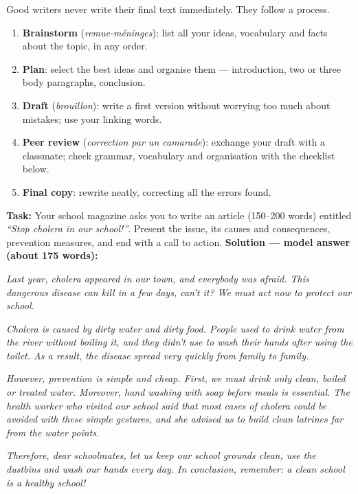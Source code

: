 \documentclass[11pt]{article}
\newcounter{popsec}
\newcounter{popsub}
\newcommand{\courssub}[1]{%
  \stepcounter{popsub}%
  \par\vspace{9pt}\noindent{\popxbold\fontsize{11.5}{13}\selectfont\color{popink}{\color{poporange}\thepopsec.\thepopsub}\hspace{6pt}#1}\par\nopagebreak\vspace{4pt}
}
\begin{document}
\courssub{The writing process: five steps}

Good writers never write their final text immediately. They follow a process.

\begin{methode}
\begin{enumerate}
\item \textbf{Brainstorm} (\emph{remue-méninges}): list all your ideas, vocabulary and facts about the topic, in any order.
\item \textbf{Plan}: select the best ideas and organise them — introduction, two or three body paragraphs, conclusion.
\item \textbf{Draft} (\emph{brouillon}): write a first version without worrying too much about mistakes; use your linking words.
\item \textbf{Peer review} (\emph{correction par un camarade}): exchange your draft with a classmate; check grammar, vocabulary and organisation with the checklist below.
\item \textbf{Final copy}: rewrite neatly, correcting all the errors found.
\end{enumerate}
\end{methode}

\begin{exoresolu}
\textbf{Task:} Your school magazine asks you to write an article (150–200 words) entitled \emph{``Stop cholera in our school!''}. Present the issue, its causes and consequences, prevention measures, and end with a call to action.
\tcblower
\textbf{Solution — model answer (about 175 words):}\par
\emph{Last year, cholera appeared in our town, and everybody was afraid. This dangerous disease can kill in a few days, can't it? We must act now to protect our school.}\par
\emph{Cholera is caused by dirty water and dirty food. People used to drink water from the river without boiling it, and they didn't use to wash their hands after using the toilet. As a result, the disease spread very quickly from family to family.}\par
\emph{However, prevention is simple and cheap. First, we must drink only clean, boiled or treated water. Moreover, hand washing with soap before meals is essential. The health worker who visited our school said that most cases of cholera could be avoided with these simple gestures, and she advised us to build clean latrines far from the water points.}\par
\emph{Therefore, dear schoolmates, let us keep our school grounds clean, use the dustbins and wash our hands every day. In conclusion, remember: a clean school is a healthy school!}
\end{exoresolu}
\end{document}
